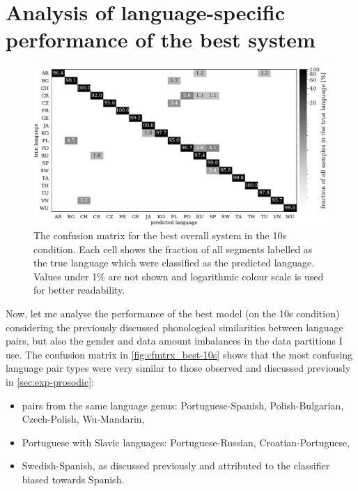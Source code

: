 \documentclass[bsc,frontabs,twoside,singlespacing,parskip,deptreport]{infthesis}
\begin{document}
{  \section{Analysis of language-specific performance of the best system}{
    \label{sec:discussion-language-specific}
    \begin{figure}[h!t]
      \centering
      \includegraphics[width=\textwidth]{../img/cfmtrx_fusion_mfcc_deltas+pitch_energy.pdf}
      \caption{The confusion matrix for the best overall system in the 10s condition. Each cell shows the fraction of all segments labelled as the true language which were classified as the predicted language. Values under 1\% are not shown and logarithmic colour scale is used for better readability.}
      \label{fig:cfmtrx_best-10s}
    \end{figure}
    Now, let me analyse the performance of the best model (on the 10s condition) considering the previously discussed phonological similarities between language pairs, but also the gender and data amount imbalances in the data partitions I use. The confusion matrix in \autoref{fig:cfmtrx_best-10s} shows that the most confusing language pair types were very similar to those observed and discussed previously in \autoref{sec:exp-prosodic}:
    \begin{itemize}
      \item {pairs from the same language genus: Portuguese-Spanish, Polish-Bulgarian, Czech-Polish, Wu-Mandarin,}
      \item {Portuguese with Slavic languages: Portuguese-Russian, Croatian-Portuguese,}
      \item {Swedish-Spanish, as discussed previously and attributed to the classifier biased towards Spanish.}
    \end{itemize}
    
}}
\end{document}
